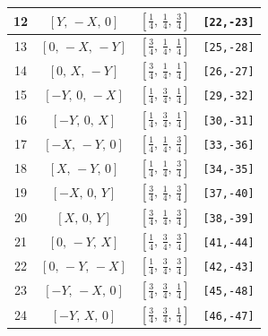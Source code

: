 \documentclass[fleqn,8pt]{jsarticle}
\begin{document}
\begin{longtable}{cccc}
12 & $\left[ Y,\, - X,\, 0 \right]$ & $\left[ \frac{1}{4},\, \frac{1}{4},\, \frac{3}{4} \right]$ & {\tt [22,-23]} \\ \hline
13 & $\left[ 0,\, - X,\, - Y \right]$ & $\left[ \frac{3}{4},\, \frac{1}{4},\, \frac{1}{4} \right]$ & {\tt [25,-28]} \\ \hline
14 & $\left[ 0,\, X,\, - Y \right]$ & $\left[ \frac{3}{4},\, \frac{1}{4},\, \frac{1}{4} \right]$ & {\tt [26,-27]} \\ \hline
15 & $\left[ - Y,\, 0,\, - X \right]$ & $\left[ \frac{1}{4},\, \frac{3}{4},\, \frac{1}{4} \right]$ & {\tt [29,-32]} \\ \hline
16 & $\left[ - Y,\, 0,\, X \right]$ & $\left[ \frac{1}{4},\, \frac{3}{4},\, \frac{1}{4} \right]$ & {\tt [30,-31]} \\ \hline
17 & $\left[ - X,\, - Y,\, 0 \right]$ & $\left[ \frac{1}{4},\, \frac{1}{4},\, \frac{3}{4} \right]$ & {\tt [33,-36]} \\ \hline
18 & $\left[ X,\, - Y,\, 0 \right]$ & $\left[ \frac{1}{4},\, \frac{1}{4},\, \frac{3}{4} \right]$ & {\tt [34,-35]} \\ \hline
19 & $\left[ - X,\, 0,\, Y \right]$ & $\left[ \frac{3}{4},\, \frac{1}{4},\, \frac{3}{4} \right]$ & {\tt [37,-40]} \\ \hline
20 & $\left[ X,\, 0,\, Y \right]$ & $\left[ \frac{3}{4},\, \frac{1}{4},\, \frac{3}{4} \right]$ & {\tt [38,-39]} \\ \hline
21 & $\left[ 0,\, - Y,\, X \right]$ & $\left[ \frac{1}{4},\, \frac{3}{4},\, \frac{3}{4} \right]$ & {\tt [41,-44]} \\ \hline
22 & $\left[ 0,\, - Y,\, - X \right]$ & $\left[ \frac{1}{4},\, \frac{3}{4},\, \frac{3}{4} \right]$ & {\tt [42,-43]} \\ \hline
23 & $\left[ - Y,\, - X,\, 0 \right]$ & $\left[ \frac{3}{4},\, \frac{3}{4},\, \frac{1}{4} \right]$ & {\tt [45,-48]} \\ \hline
24 & $\left[ - Y,\, X,\, 0 \right]$ & $\left[ \frac{3}{4},\, \frac{3}{4},\, \frac{1}{4} \right]$ & {\tt [46,-47]} \\
\end{longtable}
\renewcommand{\arraystretch}{1.2}
\end{document}
